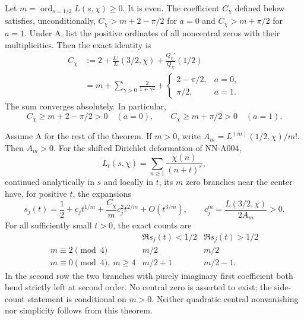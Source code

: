 \begin{theorem}
\label{thm:analytic-central-dirichlet-sign}
Let $m=\operatorname{ord}_{s=1/2}L(s,\chi)\ge0$. It is even.
The coefficient $C_\chi$ defined below satisfies, unconditionally,
$C_\chi>m+2-\pi/2$ for $a=0$ and
$C_\chi>m+\pi/2$ for $a=1$.
Under A, list the positive ordinates of all noncentral zeros
with their multiplicities. Then the exact identity is
\begin{equation}\label{eq:analytic-dirichlet-C-positive}
 \begin{split}
 C_\chi&:=2+\frac{L'}L(3/2,\chi)
                         +\frac{Q_\chi'}{Q_\chi}(1/2)\\
 &=m+\sum_{\gamma>0}\frac2{1+\gamma^2}
     +\begin{cases}2-\pi/2,&a=0,\\ \pi/2,&a=1.
       \end{cases}
 \end{split}
\end{equation}
The sum converges absolutely. In particular,
\[
 C_\chi\ge m+2-\pi/2>0\quad(a=0),\qquad
 C_\chi\ge m+\pi/2>0\quad(a=1).
\]

Assume A for the rest of the theorem. If $m>0$, write
$A_m=L^{(m)}(1/2,\chi)/m!$. Then $A_m>0$. For the shifted
Dirichlet deformation of NN-A004,
\[
 L_t(s,\chi)=\sum_{n\ge1}\frac{\chi(n)}{(n+t)^s},
\]
continued analytically in $s$ and locally in $t$, its $m$ zero
branches near the center have, for positive $t$, the expansions
\begin{equation}\label{eq:analytic-dirichlet-central-branches}
 s_j(t)=\frac12+c_jt^{1/m}
                  +\frac{C_\chi}{m}c_j^2t^{2/m}
                  +O(t^{3/m}),\qquad
 c_j^m=\frac{L(3/2,\chi)}{2A_m}>0.
\end{equation}
For all sufficiently small $t>0$, the exact counts are
\[
 \begin{array}{c|cc}
 &\Re s_j(t)<1/2&\Re s_j(t)>1/2\\ \hline
 m\equiv2\pmod4&m/2&m/2\\
 m\equiv0\pmod4,\ m\ge4&m/2+1&m/2-1.
 \end{array}
\]
In the second row the two branches with purely imaginary first
coefficient both bend strictly left at second order. No central
zero is asserted to exist; the side-count statement is
conditional on $m>0$. Neither quadratic central nonvanishing nor
simplicity follows from this theorem.
\end{theorem}

